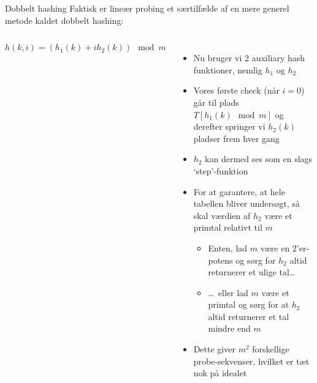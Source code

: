 \documentclass[aspectratio=1610]{beamer}
\begin{document}
\begin{frame}{Dobbelt hashing}{}
    Faktisk er lineær probing et særtilfælde af en mere generel metode kaldet
    \alert{dobbelt hashing}:

    \begin{columns}[t]
        \[
            h(k,i) = (h_1(k) + i h_2(k)) \mod m
        \] 

        \begin{itemize}
            \small
            \item Nu bruger vi 2 auxiliary hash funktioner, nemlig $h_1$ og $h_2$
            \item Vores første check (når $i=0$) går til plads $T[h_1(k) \mod m]$ og
                derefter springer vi $h_2(k)$ pladser frem hver gang
            \item $h_2$ kan dermed ses som en slags `step'-funktion
            \item For at garantere, at hele tabellen bliver undersøgt, så skal
                værdien af $h_2$ være et primtal relativt til $m$
                \begin{itemize}
                    \item Enten, lad $m$ være en 2'er-potens og sørg for $h_2$ altid
                        returnerer et ulige tal\ldots
                    \item \ldots\ eller lad $m$ være et primtal og sørg for at $h_2$
                        altid returnerer et tal mindre end $m$
                \end{itemize}
            \item Dette giver $m^2$ forskellige probe-sekvenser, hvilket er tæt nok
                på idealet
        \end{itemize}
    

\end{columns}
\end{frame}
\end{document}
